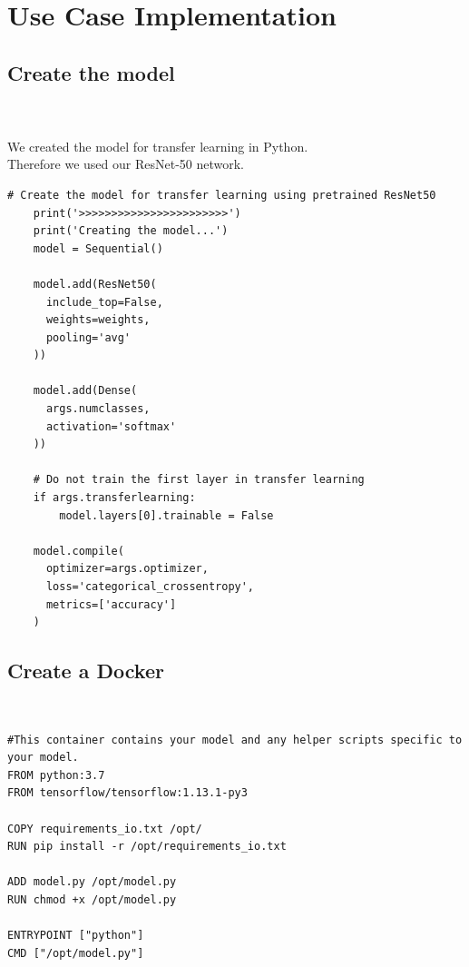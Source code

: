 \documentclass[
	12pt, %
]{fphw}
\begin{document}
\section{Use Case Implementation}

\subsection*{Create the model}
\ \\  \ \\
We created the model for transfer learning in Python. \\
Therefore we used our ResNet-50 network.
\begin{lstlisting}
# Create the model for transfer learning using pretrained ResNet50
    print('>>>>>>>>>>>>>>>>>>>>>>>')
    print('Creating the model...')
    model = Sequential()
    
    model.add(ResNet50(    
      include_top=False,   
      weights=weights, 
      pooling='avg' 
    ))
    
    model.add(Dense(
      args.numclasses, 
      activation='softmax' 
    ))
    
    # Do not train the first layer in transfer learning
    if args.transferlearning:
        model.layers[0].trainable = False

    model.compile(
      optimizer=args.optimizer, 
      loss='categorical_crossentropy', 
      metrics=['accuracy'] 
    )
\end{lstlisting}
\subsection*{Create a Docker}
\ \\  
\begin{lstlisting}
#This container contains your model and any helper scripts specific to your model.
FROM python:3.7
FROM tensorflow/tensorflow:1.13.1-py3

COPY requirements_io.txt /opt/
RUN pip install -r /opt/requirements_io.txt

ADD model.py /opt/model.py
RUN chmod +x /opt/model.py

ENTRYPOINT ["python"]
CMD ["/opt/model.py"]
\end{lstlisting}
\end{document}
